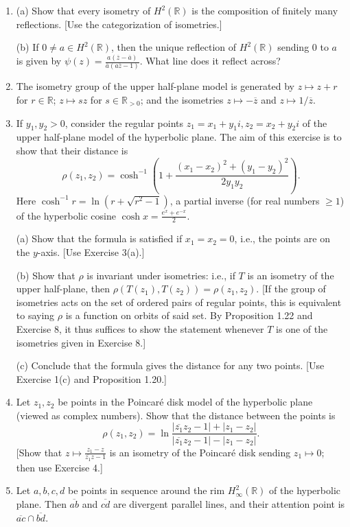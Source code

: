 \documentclass[leqno]{book}
\begin{document}
\begin{enumerate}
\item (a) Show that every isometry of $H^2(\mathbb R)$ is the composition of finitely many reflections.  [Use the categorization of isometries.]

(b) If $0\ne a\in H^2(\mathbb R)$, then the unique reflection of $H^2(\mathbb R)$ sending $0$ to $a$ is given by $\psi(z)=\frac{a(\overline z-\overline a)}{\overline a(a\overline z-1)}$.  What line does it reflect across?

\item The isometry group of the upper half-plane model is generated by $z\mapsto z+r$ for $r\in\mathbb R$; $z\mapsto sz$ for $s\in\mathbb R_{>0}$; and the isometries $z\mapsto -\overline z$ and $z\mapsto 1/\overline z$.

\item If $y_1,y_2>0$, consider the regular points $z_1=x_1+y_1i,z_2=x_2+y_2i$ of the upper half-plane model of the hyperbolic plane.  The aim of this exercise is to show that their distance is
$$\rho(z_1,z_2)=\cosh^{-1}\left(1+\frac{(x_1-x_2)^2+(y_1-y_2)^2}{2y_1y_2}\right).$$
Here $\cosh^{-1}r=\ln(r+\sqrt{r^2-1})$, a partial inverse (for real numbers $\geqslant 1$) of the hyperbolic cosine $\cosh x=\frac{e^x+e^{-x}}2$.

(a) Show that the formula is satisfied if $x_1=x_2=0$, i.e., the points are on the $y$-axis.  [Use Exercise 3(a).]

(b) Show that $\rho$ is invariant under isometries: i.e., if $T$ is an isometry of the upper half-plane, then $\rho(T(z_1),T(z_2))=\rho(z_1,z_2)$.  [If the group of isometries acts on the set of ordered pairs of regular points, this is equivalent to saying $\rho$ is a function on orbits of said set.  By Proposition 1.22 and Exercise 8, it thus suffices to show the statement whenever $T$ is one of the isometries given in Exercise 8.]

(c) Conclude that the formula gives the distance for any two points.  [Use Exercise 1(c) and Proposition 1.20.]

\item Let $z_1,z_2$ be points in the Poincar\'e disk model of the hyperbolic plane (viewed as complex numbers).  Show that the distance between the points is
$$\rho(z_1,z_2)=\ln\frac{|\overline{z_1}z_2-1|+|z_1-z_2|}{|\overline{z_1}z_2-1|-|z_1-z_2|}.$$
[Show that $z\mapsto\frac{z_1-z}{\overline{z_1}z-1}$ is an isometry of the Poincar\'e disk sending $z_1\mapsto 0$; then use Exercise 4.]

\item Let $a,b,c,d$ be points in sequence around the rim $H^2_\infty(\mathbb R)$ of the hyperbolic plane.  Then $\overline{ab}$ and $\overline{cd}$ are divergent parallel lines, and their attention point is $\overline{ac}\cap\overline{bd}$.


\end{enumerate}
\end{document}
